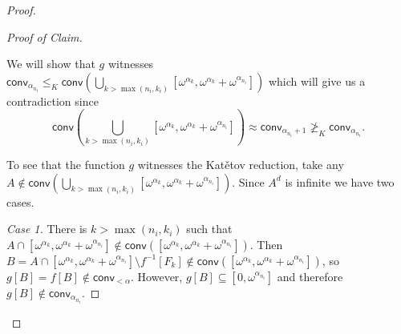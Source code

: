 \documentclass{amsart}
\theoremstyle{plain}
\theoremstyle{definition}
\theoremstyle{remark}
\newcommand{\conv}{\mathsf{conv}}
\renewcommand{\subset}{\subseteq}
\begin{document}
\begin{proof}
\begin{proof}[Proof of Claim]
\begin{enumerate}
 \end{enumerate}

We will show that $g $ witnesses $\conv_{\alpha_{n_i}}\leq_K \conv(\bigcup_{k>\max(n_i,k_i)} [\omega^{\alpha_k},\omega^{\alpha_k}+\omega^{\alpha_{n_i}}])$ which will give us a contradiction since 
$$\conv\left(\bigcup_{k>\max(n_i,k_i)} [\omega^{\alpha_k},\omega^{\alpha_k}+\omega^{\alpha_{n_i}}]\right) \approx \conv_{\alpha_{n_{i}}+1}\not\geq_K\conv_{\alpha_{n_i}}.$$

To see that the function $g$ witnesses the Kat\v{e}tov  reduction, take any $A\notin  \conv(\bigcup_{k>\max(n_i,k_i)} [\omega^{\alpha_k},\omega^{\alpha_k}+\omega^{\alpha_{n_i}}])$. Since $A^d$ is infinite we have two cases.

\emph{Case 1.} There is  $k>\max(n_i,k_i)$ such that $A\cap [\omega^{\alpha_k},\omega^{\alpha_k}+\omega^{\alpha_{n_i}}]\notin \conv([\omega^{\alpha_k},\omega^{\alpha_k}+\omega^{\alpha_{n_i}}])$. Then $B=A\cap [\omega^{\alpha_k},\omega^{\alpha_k}+\omega^{\alpha_{n_i}}]\setminus f^{-1} [F_k]\notin \conv([\omega^{\alpha_k},\omega^{\alpha_k}+\omega^{\alpha_{n_i}}]) $, so $g[B]=f[B]\notin \conv_{<\alpha}$. However, $g[B]\subset [0,\omega^{\alpha_{n_i}}]$ and therefore $g[B]\notin\conv_{\alpha_{n_i}}.$


\end{proof}
\end{proof}
\end{document}
